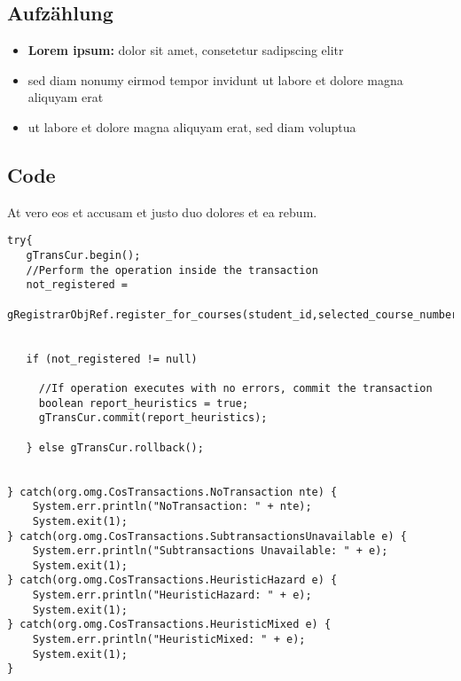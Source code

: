\subsection{Aufzählung}

\begin{itemize}
	\item \textbf{Lorem ipsum:} dolor sit amet, consetetur sadipscing elitr
	\item sed diam nonumy eirmod tempor invidunt ut labore et dolore magna aliquyam erat
	\item ut labore et dolore magna aliquyam erat, sed diam voluptua
\end{itemize}

\subsection{Code}

At vero eos et accusam et justo duo dolores et ea rebum.

\begin{lstlisting}[style=Java, caption=Implizite Transaktion \cite{tanenbaum2007verteilte}]
try{
   gTransCur.begin();
   //Perform the operation inside the transaction
   not_registered = 
       gRegistrarObjRef.register_for_courses(student_id,selected_course_numbers);


   if (not_registered != null)

     //If operation executes with no errors, commit the transaction
     boolean report_heuristics = true;
     gTransCur.commit(report_heuristics);

   } else gTransCur.rollback();


} catch(org.omg.CosTransactions.NoTransaction nte) {
    System.err.println("NoTransaction: " + nte);
    System.exit(1);
} catch(org.omg.CosTransactions.SubtransactionsUnavailable e) {
    System.err.println("Subtransactions Unavailable: " + e);
    System.exit(1);
} catch(org.omg.CosTransactions.HeuristicHazard e) {
    System.err.println("HeuristicHazard: " + e);
    System.exit(1);
} catch(org.omg.CosTransactions.HeuristicMixed e) {
    System.err.println("HeuristicMixed: " + e);
    System.exit(1);
}
\end{lstlisting}

